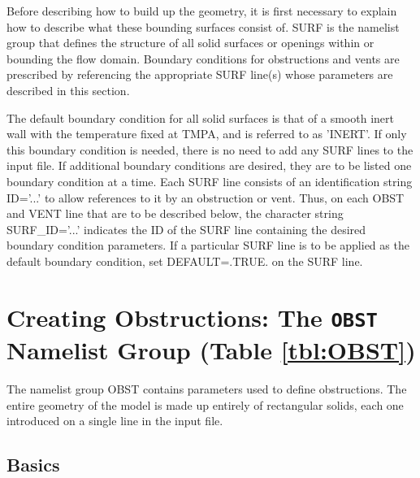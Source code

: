 \documentclass[11pt]{book}
\begin{document}
Before describing how to build up the geometry, it is first necessary to explain how to describe what these bounding surfaces
consist of. {\ct SURF} is the namelist group that defines
the structure of all solid surfaces or openings within or
bounding the flow domain. Boundary conditions for obstructions and vents are
prescribed by referencing the appropriate {\ct SURF} line(s) whose
parameters are described in this section.

The default boundary condition for all solid surfaces is that of a smooth
inert wall with the temperature fixed at {\ct TMPA}, and is referred to as {\ct 'INERT'}. If only this
boundary condition is needed, there is no need to add any {\ct SURF} lines
to the input file. If additional boundary conditions are desired,
they are to be listed one boundary condition at a time.
Each {\ct SURF} line consists of an identification string {\ct ID='...'} to
allow references to it by an obstruction or vent. Thus, on each
{\ct OBST} and {\ct VENT} line that are to be described below, the character string {\ct SURF\_ID='...'}
indicates the {\ct ID} of the {\ct SURF} line containing the desired boundary
condition parameters. If a particular {\ct SURF} line is to be applied
as the default boundary condition,
set {\ct DEFAULT=.TRUE.} on the {\ct SURF} line.




\section{Creating Obstructions: The \texorpdfstring{{\tt OBST}}{OBST} Namelist Group (Table \ref{tbl:OBST})}
\label{info:OBST}

The namelist group {\ct OBST} contains parameters used to define obstructions. The entire geometry of the model is made up entirely of rectangular solids, each one introduced on a single line in the input file.

\subsection{Basics}
\label{info:OBST_Basics}
\end{document}
